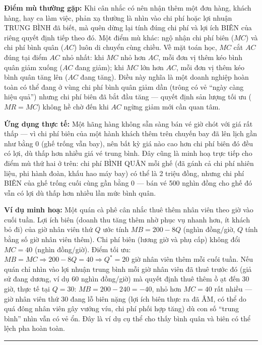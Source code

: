\documentclass[
]{article}
\begin{document}
\textbf{Điểm mù thường gặp:} Khi cân nhắc có nên nhận thêm một đơn hàng,
khách hàng, hay ca làm việc, phản xạ thường là nhìn vào chi phí hoặc lợi
nhuận TRUNG BÌNH đã biết, mà quên dừng lại tính đúng chi phí và lợi ích
BIÊN của riêng quyết định tiếp theo đó. Một điểm mù khác: ngộ nhận chi
phí biên (\(MC\)) và chi phí bình quân (\(AC\)) luôn di chuyển cùng
chiều. Về mặt toán học, \(MC\) cắt \(AC\) đúng tại điểm \(AC\) nhỏ nhất:
khi \(MC\) nhỏ hơn \(AC\), mỗi đơn vị thêm kéo bình quân giảm xuống
(\(AC\) đang giảm); khi \(MC\) lớn hơn \(AC\), mỗi đơn vị thêm kéo bình
quân tăng lên (\(AC\) đang tăng). Điều này nghĩa là một doanh nghiệp
hoàn toàn có thể đang ở vùng chi phí bình quân giảm dần (trông có vẻ
``ngày càng hiệu quả'') nhưng chi phí biên đã bắt đầu tăng --- quyết
định sản lượng tối ưu (\(MR = MC\)) không hề chờ đến khi \(AC\) ngừng
giảm mới cần quan tâm.

\textbf{Ứng dụng thực tế:} Một hãng hàng không sẵn sàng bán vé giờ chót
với giá rất thấp --- vì chi phí biên của một hành khách thêm trên chuyến
bay đã lên lịch gần như bằng 0 (ghế trống vẫn bay), nên bất kỳ giá nào
cao hơn chi phí biên đó đều có lợi, dù thấp hơn nhiều giá vé trung bình.
Đây cũng là minh hoạ trực tiếp cho điểm mù thứ hai ở trên: chi phí BÌNH
QUÂN mỗi ghế (đã gánh cả chi phí nhiên liệu, phi hành đoàn, khấu hao máy
bay) có thể là 2 triệu đồng, nhưng chi phí BIÊN của ghế trống cuối cùng
gần bằng 0 --- bán vé 500 nghìn đồng cho ghế đó vẫn có lợi dù thấp hơn
nhiều lần mức bình quân.

\textbf{Ví dụ minh hoạ:} Một quán cà phê cân nhắc thuê thêm nhân viên
theo giờ vào cuối tuần. Lợi ích biên (doanh thu tăng thêm nhờ phục vụ
nhanh hơn, ít khách bỏ đi) của giờ nhân viên thứ \(Q\) ước tính
\(MB = 200 - 8Q\) (nghìn đồng/giờ, \(Q\) tính bằng số giờ nhân viên
thêm). Chi phí biên (lương giờ và phụ cấp) không đổi \(MC = 40\) (nghìn
đồng/giờ). Điểm tối ưu:
\(MB = MC \Rightarrow 200 - 8Q = 40 \Rightarrow Q^* = 20\) giờ nhân viên
thêm mỗi cuối tuần. Nếu quán chỉ nhìn vào lợi nhuận trung bình mỗi giờ
nhân viên đã thuê trước đó (giả sử đang dương, ví dụ 60 nghìn đồng/giờ)
mà quyết định thuê thêm ồ ạt đến 30 giờ, thực tế tại \(Q = 30\):
\(MB = 200 - 240 = -40\), nhỏ hơn \(MC = 40\) rất nhiều --- giờ nhân
viên thứ 30 đang lỗ biên nặng (lợi ích biên thực ra đã ÂM, có thể do quá
đông nhân viên gây vướng víu, chi phí phối hợp tăng) dù con số ``trung
bình'' nhìn vẫn có vẻ ổn. Đây là ví dụ cụ thể cho thấy bình quân và biên
có thể lệch pha hoàn toàn.

\begin{center}\rule{0.5\linewidth}{0.5pt}\end{center}
\end{document}
